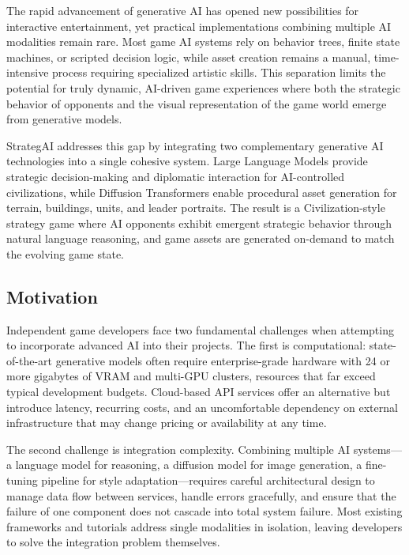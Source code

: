 \documentclass[conference]{IEEEtran}
\begin{document}
The rapid advancement of generative AI has opened new possibilities for interactive entertainment, yet practical implementations combining multiple AI modalities remain rare. Most game AI systems rely on behavior trees, finite state machines, or scripted decision logic, while asset creation remains a manual, time-intensive process requiring specialized artistic skills. This separation limits the potential for truly dynamic, AI-driven game experiences where both the strategic behavior of opponents and the visual representation of the game world emerge from generative models.

StrategAI addresses this gap by integrating two complementary generative AI technologies into a single cohesive system. Large Language Models provide strategic decision-making and diplomatic interaction for AI-controlled civilizations, while Diffusion Transformers enable procedural asset generation for terrain, buildings, units, and leader portraits. The result is a Civilization-style strategy game where AI opponents exhibit emergent strategic behavior through natural language reasoning, and game assets are generated on-demand to match the evolving game state.

\subsection{Motivation}

Independent game developers face two fundamental challenges when attempting to incorporate advanced AI into their projects. The first is computational: state-of-the-art generative models often require enterprise-grade hardware with 24 or more gigabytes of VRAM and multi-GPU clusters, resources that far exceed typical development budgets. Cloud-based API services offer an alternative but introduce latency, recurring costs, and an uncomfortable dependency on external infrastructure that may change pricing or availability at any time.

The second challenge is integration complexity. Combining multiple AI systems---a language model for reasoning, a diffusion model for image generation, a fine-tuning pipeline for style adaptation---requires careful architectural design to manage data flow between services, handle errors gracefully, and ensure that the failure of one component does not cascade into total system failure. Most existing frameworks and tutorials address single modalities in isolation, leaving developers to solve the integration problem themselves.
\end{document}
